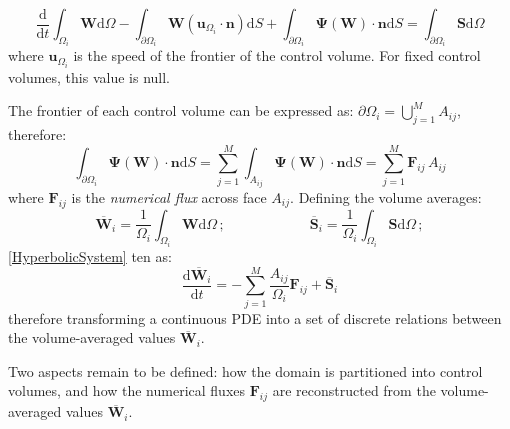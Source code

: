 \documentclass[11pt, a4paper, oneside, openany]{book}
\begin{document}
\begin{equation*}
\dfrac{\mathrm{d}}{\mathrm{d}t}\int_{\Omega_{i}}\boldsymbol{W}\mathrm{d}\Omega-\int_{\partial\Omega_{i}}\boldsymbol{W}\left(\boldsymbol{u}_{\Omega_{i}}\cdot\boldsymbol{n}\right)\mathrm{d}S+\int_{\partial\Omega_{i}}\boldsymbol{\Psi}\left(\boldsymbol{W}\right)\cdot\boldsymbol{n}\mathrm{d}S=\int_{\partial\Omega_{i}}\boldsymbol{S}\mathrm{d}\Omega
\end{equation*}
where $\boldsymbol{u}_{\Omega_{i}}$ is the speed of the frontier of the control volume. For fixed control volumes, this value is null.\par
The frontier of each control volume can be expressed as: $\partial\Omega_{i}=\bigcup_{j=1}^{M}A_{ij}$, therefore:
\begin{equation*}
\int_{\partial\Omega_{i}}\boldsymbol{\Psi}\left(\boldsymbol{W}\right)\cdot\boldsymbol{n}\mathrm{d}S=\sum_{j=1}^{M}\int_{A_{ij}}\boldsymbol{\Psi}\left(\boldsymbol{W}\right)\cdot\boldsymbol{n}\mathrm{d}S=\sum_{j=1}^{M}\boldsymbol{F}_{ij}\,A_{ij}
\end{equation*}
where $\boldsymbol{F}_{ij}$ is the \textit{numerical flux} across face $A_{ij}$. Defining the volume averages:
\begin{equation*}
\boldsymbol{\overline{W}}_{i}=\dfrac{1}{\Omega_i}\int_{\Omega_{i}}\boldsymbol{W}\mathrm{d}\Omega\,;\qquad\qquad\qquad\boldsymbol{\overline{S}}_{i}=\dfrac{1}{\Omega_i}\int_{\Omega_{i}}\boldsymbol{S}\mathrm{d}\Omega\,;
\end{equation*}
\eqref{HyperbolicSystem} 
ten as:
\begin{equation*}
\dfrac{\mathrm{d}\boldsymbol{\overline{W}}_{i}}{\mathrm{d}t}=-\sum_{j=1}^{M}\dfrac{A_{ij}}{\Omega_{i}}\boldsymbol{F}_{ij}+\boldsymbol{\overline{S}}_{i}\label{HyperbolicCVDiscrete}
\end{equation*}
therefore transforming a continuous PDE into a set of discrete relations between the volume-averaged values $\overline{\boldsymbol{W}}_{i}$.\par
Two aspects remain to be defined: how the domain is partitioned into control volumes, and how the numerical fluxes $\boldsymbol{F}_{ij}$ are reconstructed from the volume-averaged values $\overline{\boldsymbol{W}}_{i}$.
\end{document}
